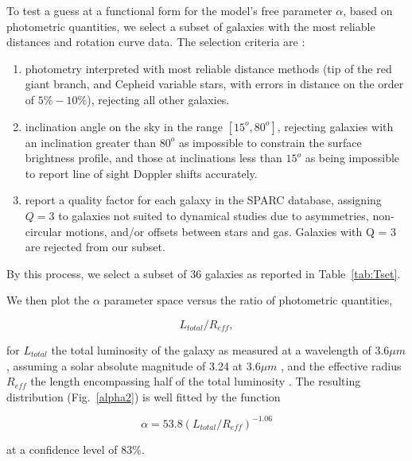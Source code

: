 \documentclass[reprint,%
 amsmath,amssymb,
 aps,
]{revtex4-1}
\begin{document}
  To test a guess at a functional form  for the  model's free parameter $\alpha$,  based on photometric quantities, we   select a subset of galaxies with the most reliable distances and rotation curve data. 
  The selection  criteria are \cite{2016Lelli}:  
  \begin{enumerate}
      \item photometry interpreted with most reliable  distance methods    (tip of the red giant branch, and Cepheid variable stars,  with errors in distance on the order of $5\% - 10\%$), rejecting all other galaxies. \\
      \item  inclination angle on the sky  in the range  $[15^o, 80^o]$, rejecting galaxies with an inclination  greater than $80^o$ as impossible to constrain the surface brightness profile, and those at inclinations less than $15^o$ as being impossible to  report line of sight Doppler shifts accurately.\\
      \item  \citet{2016Lelli}   report a quality factor for each galaxy in the SPARC database, assigning  $Q=3$ to galaxies not suited to dynamical studies due to     asymmetries,  non-circular motions, and/or offsets between stars and gas. Galaxies with Q = 3 are rejected from our subset.
  \end{enumerate}
    By this process, we select a subset of 36 galaxies as reported in Table~\ref{tab:Tset}. 


 We then plot the  $\alpha$   parameter  space versus the ratio of  photometric quantities,  
  
\begin{equation}
    L_{total}/R_{eff}, 
\end{equation}
 
 for  $L_{total}$    the  total luminosity of the galaxy as measured  at a wavelength of $3.6 \mu m$,  assuming a solar
absolute magnitude of 3.24 at $3.6 \mu m$ \cite{oh2008high}, and the effective radius $R_{eff}$    the length encompassing half of the total luminosity \cite{2016Lelli}. 
 The resulting distribution    (Fig.~\ref{alpha2}) is  well fitted by the function 
 
    
\begin{equation}
    \alpha =  
    53.8 (L_{total}/R_{eff})^{-1.06}
       \label{FreeParamFix}
\end{equation}

at a confidence level of $83\%$.
  
\end{document}
